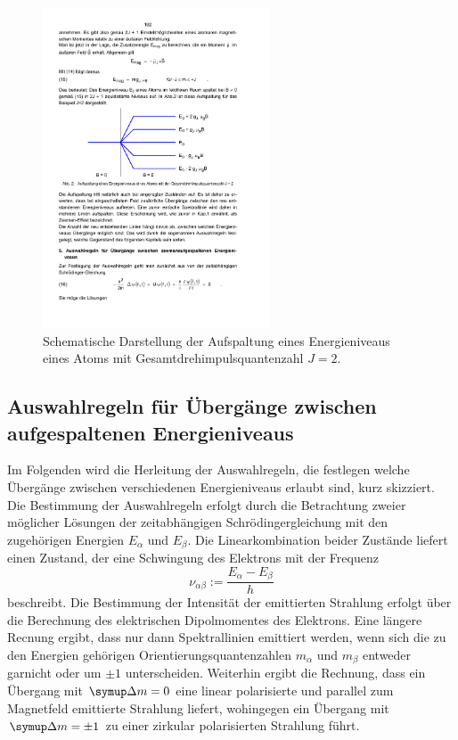 \begin{figure}
    \centering
    \includegraphics[width=0.6\textwidth]{figure/aufspaltung.pdf}
    \caption{Schematische Darstellung der Aufspaltung eines Energieniveaus eines Atoms mit Gesamtdrehimpulsquantenzahl $J=2$.\cite{V27}}
    \label{fig:aufspaltung}
\end{figure}
%
\subsection{Auswahlregeln für Übergänge zwischen aufgespaltenen Energieniveaus}
%
Im Folgenden wird die Herleitung der Auswahlregeln, die festlegen welche Übergänge zwischen verschiedenen Energieniveaus erlaubt sind, kurz skizziert.
Die Bestimmung der Auswahlregeln erfolgt durch die Betrachtung zweier möglicher Lösungen der zeitabhängigen Schrödingergleichung mit den zugehörigen Energien $E_{\alpha}$ und $E_{\beta}$.
Die Linearkombination beider Zustände liefert einen Zustand, der eine Schwingung des Elektrons mit der Frequenz
%
\begin{equation}
    \nu_{\alpha\beta}:=\frac{E_{\alpha}-E_{\beta}}{h}
\end{equation}
%
beschreibt.
Die Bestimmung der Intensität der emittierten Strahlung erfolgt über die Berechnung des elektrischen Dipolmomentes des Elektrons.
Eine längere Recnung ergibt, dass nur dann Spektrallinien emittiert werden, wenn sich die zu den Energien gehörigen Orientierungsquantenzahlen $m_{\alpha}$ und $m_{\beta}$ entweder garnicht oder um $\pm 1$ unterscheiden.
Weiterhin ergibt die Rechnung, dass ein Übergang mit $\upD m=0$ eine linear polarisierte und parallel zum Magnetfeld emittierte Strahlung liefert, wohingegen ein Übergang mit $\upD m=\pm1$ zu einer zirkular polarisierten Strahlung führt.
%
